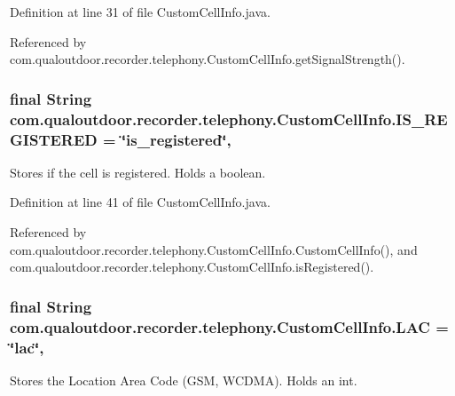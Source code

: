 Definition at line 31 of file Custom\-Cell\-Info.\-java.



Referenced by com.\-qualoutdoor.\-recorder.\-telephony.\-Custom\-Cell\-Info.\-get\-Signal\-Strength().

\hypertarget{classcom_1_1qualoutdoor_1_1recorder_1_1telephony_1_1CustomCellInfo_a57373f5459c9605b6881c79bc4eb51cb}{
\subsubsection[{I\-S\-\_\-\-R\-E\-G\-I\-S\-T\-E\-R\-E\-D}]{\setlength{\rightskip}{0pt plus 5cm}final String com.\-qualoutdoor.\-recorder.\-telephony.\-Custom\-Cell\-Info.\-I\-S\-\_\-\-R\-E\-G\-I\-S\-T\-E\-R\-E\-D = \char`\"{}is\-\_\-registered\char`\"{}\hspace{0.3cm}{\ttfamily [static]}, {\ttfamily [private]}}}\label{classcom_1_1qualoutdoor_1_1recorder_1_1telephony_1_1CustomCellInfo_a57373f5459c9605b6881c79bc4eb51cb}
Stores if the cell is registered. Holds a boolean. 

Definition at line 41 of file Custom\-Cell\-Info.\-java.



Referenced by com.\-qualoutdoor.\-recorder.\-telephony.\-Custom\-Cell\-Info.\-Custom\-Cell\-Info(), and com.\-qualoutdoor.\-recorder.\-telephony.\-Custom\-Cell\-Info.\-is\-Registered().

\hypertarget{classcom_1_1qualoutdoor_1_1recorder_1_1telephony_1_1CustomCellInfo_abbcac278b7713cb160b37b86696ba40a}{
\subsubsection[{L\-A\-C}]{\setlength{\rightskip}{0pt plus 5cm}final String com.\-qualoutdoor.\-recorder.\-telephony.\-Custom\-Cell\-Info.\-L\-A\-C = \char`\"{}lac\char`\"{}\hspace{0.3cm}{\ttfamily [static]}, {\ttfamily [private]}}}\label{classcom_1_1qualoutdoor_1_1recorder_1_1telephony_1_1CustomCellInfo_abbcac278b7713cb160b37b86696ba40a}
Stores the Location Area Code (G\-S\-M, W\-C\-D\-M\-A). Holds an int. 

